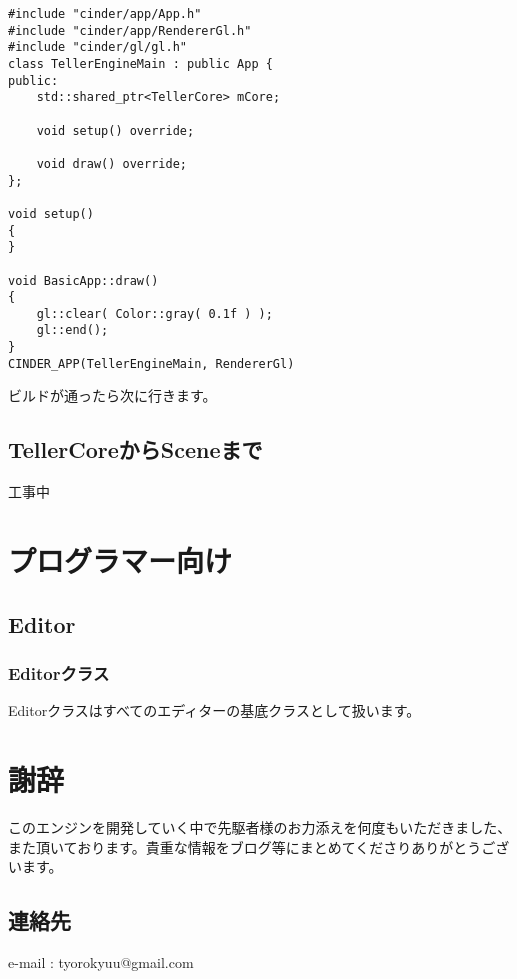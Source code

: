 \documentclass[12pt,a4paper,uplatex,dvipdfmx]{jsarticle}
\begin{document}
\begin{lstlisting}[caption=hoge,label=fuga]
#include "cinder/app/App.h"
#include "cinder/app/RendererGl.h"
#include "cinder/gl/gl.h"
class TellerEngineMain : public App {
public:
	std::shared_ptr<TellerCore> mCore;

	void setup() override;

	void draw() override;
};

void setup()
{
}

void BasicApp::draw()
{
	gl::clear( Color::gray( 0.1f ) );
	gl::end();
}
CINDER_APP(TellerEngineMain, RendererGl)
\end{lstlisting}

ビルドが通ったら次に行きます。
\subsection{TellerCoreからSceneまで}

\Large{工事中}
\normalsize

\section{プログラマー向け}
\subsection{Editor}
\subsubsection{Editorクラス}
Editorクラスはすべてのエディターの基底クラスとして扱います。


\newpage
\appendix
\section*{謝辞}
このエンジンを開発していく中で先駆者様のお力添えを何度もいただきました、また頂いております。貴重な情報をブログ等にまとめてくださりありがとうございます。

\subsection*{連絡先}
e-mail : tyorokyuu@gmail.com
\end{document}
